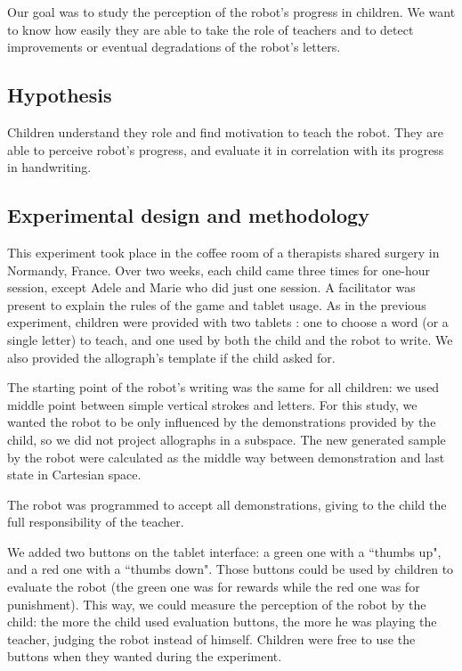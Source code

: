 \documentclass[conference]{IEEEtran}
\begin{document}
Our goal was to study the perception of the robot's progress in children. We want to know how easily they are able to take the role of teachers and to detect improvements or eventual degradations of the robot's letters. 


\subsection{Hypothesis}

Children understand they role and find motivation to teach the robot. They are able to perceive robot's progress, and evaluate it in correlation with its progress in handwriting.

\subsection{Experimental design and methodology}

This experiment took place in the coffee room of a therapists shared surgery
in Normandy, France. Over two weeks, each child came three times for one-hour
session, except Adele and Marie who did just one session. A facilitator was present to explain the rules of the game and tablet usage. As in the previous experiment, children were provided with two tablets : one to choose a word (or a single letter) to teach, and one
used by both the child and the robot to write. We also provided the allograph's template if the child asked for. 

The starting point of the robot's writing was the same for all children: we
used middle point between simple vertical strokes and letters. For this study,
we wanted the robot to be only influenced by the demonstrations provided by the
child, so we did not project allographs in a subspace. The new generated
sample by the robot were calculated as the middle way between demonstration and
last state in Cartesian space. 

The robot was programmed to accept all demonstrations, giving to the child the
full responsibility of the teacher.

We added two buttons on the tablet  interface: a green one with a ``thumbs up", and
a red one with a ``thumbs down". Those buttons could be used by children to evaluate the
robot (the green one was for rewards while the red one was for punishment). This
way, we could measure the perception of the robot by the child: the more the
child used evaluation buttons, the more he was playing the teacher, judging the
robot instead of himself. Children were free to use the buttons when they wanted during the experiment. 
\end{document}
